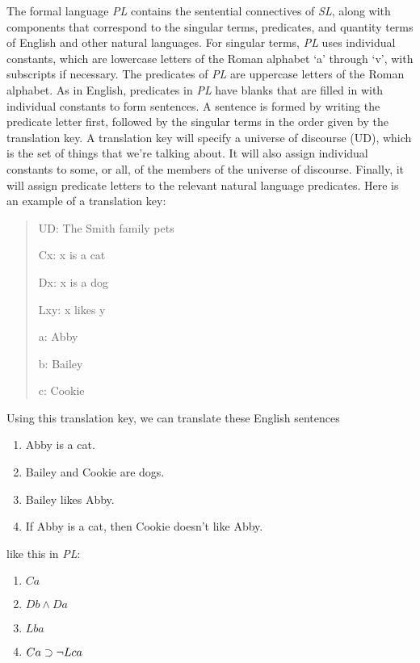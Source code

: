 \documentclass[../logic-text.tex]{subfiles}
\begin{document}
The formal language \emph{PL} contains the sentential connectives of \emph{SL}, along with components that correspond to the singular terms, predicates, and quantity terms of English and other natural languages.
For singular terms, \emph{PL} uses individual constants, which are lowercase letters of the Roman alphabet \enquote*{a} through \enquote*{v}, with subscripts if necessary.
The predicates of \emph{PL} are uppercase letters of the Roman alphabet.
As in English, predicates in \emph{PL} have blanks that are filled in with individual constants to form sentences.
A sentence is formed by writing the predicate letter first, followed by the singular terms in the order given by the translation key.
A translation key will specify a universe of discourse (UD), which is the set of things that we're talking about.
It will also assign individual constants to some, or all, of the members of the universe of discourse.
Finally, it will assign predicate letters to the relevant natural language predicates.
Here is an example of a translation key:

\begin{quote}
  UD: The Smith family pets

  Cx: x is a cat

  Dx: x is a dog

  Lxy: x likes y

  a: Abby

  b: Bailey

  c: Cookie
\end{quote}


Using this translation key, we can translate these English sentences

\begin{enumerate}
  \item Abby is a cat.
  \item Bailey and Cookie are dogs.
  \item Bailey likes Abby.
  \item If Abby is a cat, then Cookie doesn't like Abby.
\end{enumerate}

\noindent like this in \emph{PL}:

\begin{enumerate}
  \item \(Ca\)
  \item \(Db \land  Da\)
  \item \(Lba\)
  \item \(Ca \supset \neg Lca\) 
\end{enumerate}
\end{document}
